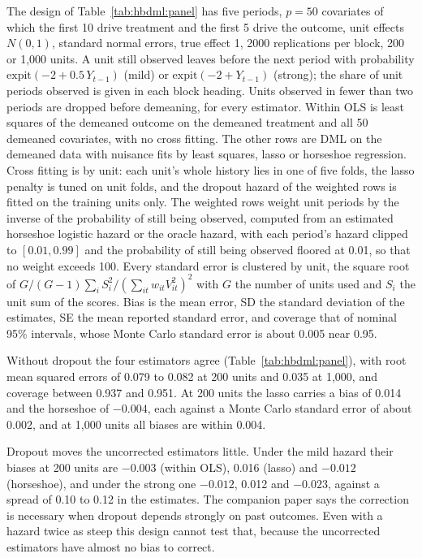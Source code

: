 The design of Table~\ref{tab:hbdml:panel} has five periods, $p = 50$ covariates of which the first 10 drive treatment and the first 5 drive the outcome, unit effects $N(0,1)$, standard normal errors, true effect 1, 2000 replications per block, 200 or 1,000 units. A unit still observed leaves before the next period with probability $\mathrm{expit}(-2 + 0.5\,Y_{t-1})$ (mild) or $\mathrm{expit}(-2 + Y_{t-1})$ (strong); the share of unit periods observed is given in each block heading. Units observed in fewer than two periods are dropped before demeaning, for every estimator. Within OLS is least squares of the demeaned outcome on the demeaned treatment and all 50 demeaned covariates, with no cross fitting. The other rows are DML on the demeaned data with nuisance fits by least squares, lasso or horseshoe regression. Cross fitting is by unit: each unit's whole history lies in one of five folds, the lasso penalty is tuned on unit folds, and the dropout hazard of the weighted rows is fitted on the training units only. The weighted rows weight unit periods by the inverse of the probability of still being observed, computed from an estimated horseshoe logistic hazard or the oracle hazard, with each period's hazard clipped to $[0.01, 0.99]$ and the probability of still being observed floored at 0.01, so that no weight exceeds 100. Every standard error is clustered by unit, the square root of $G/(G-1)\sum_i S_i^2/(\sum_{it} w_{it}V_{it}^2)^2$ with $G$ the number of units used and $S_i$ the unit sum of the scores. Bias is the mean error, SD the standard deviation of the estimates, SE the mean reported standard error, and coverage that of nominal 95\% intervals, whose Monte Carlo standard error is about 0.005 near 0.95.



Without dropout the four estimators agree (Table~\ref{tab:hbdml:panel}), with root mean squared errors of 0.079 to 0.082 at 200 units and 0.035 at 1,000, and coverage between 0.937 and 0.951.  At 200 units the lasso carries a bias of 0.014 and the horseshoe of $-0.004$, each against a Monte Carlo standard error of about 0.002, and at 1,000 units all biases are within 0.004.

Dropout moves the uncorrected estimators little. Under the mild hazard their biases at 200 units are $-0.003$ (within OLS), 0.016 (lasso) and $-0.012$ (horseshoe), and under the strong one $-0.012$, 0.012 and $-0.023$, against a spread of 0.10 to 0.12 in the estimates. The companion paper says the correction is necessary when dropout depends strongly on past outcomes. Even with a hazard twice as steep this design cannot test that, because the uncorrected estimators have almost no bias to correct.


